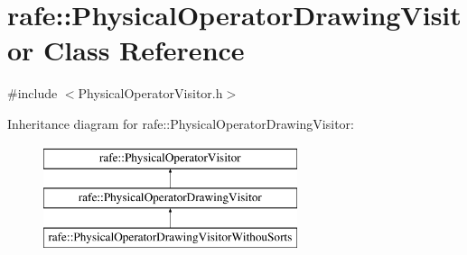 \hypertarget{classrafe_1_1_physical_operator_drawing_visitor}{\section{rafe\+:\+:Physical\+Operator\+Drawing\+Visitor Class Reference}
\label{classrafe_1_1_physical_operator_drawing_visitor}
}


{\ttfamily \#include $<$Physical\+Operator\+Visitor.\+h$>$}

Inheritance diagram for rafe\+:\+:Physical\+Operator\+Drawing\+Visitor\+:\begin{figure}[H]
\begin{center}
\leavevmode
\includegraphics[height=3.000000cm]{classrafe_1_1_physical_operator_drawing_visitor}
\end{center}
\end{figure}
